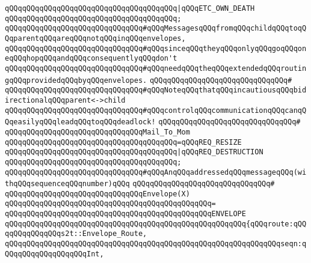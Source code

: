 \verb|qQQqqQQqqQQqqQQqqQQqqQQqqQQqqQQqqQQqqQQq|\verb#|qQQqETC_OWN_DEATH#\newline
\verb|qQQqqQQqqQQqqQQqqQQqqQQqqQQqqQQqqQQqqQQq;|\newline
\newline
\verb|qQQqqQQqqQQqqQQqqQQqqQQqqQQqqQQq#qQQqMessagesqQQqfromqQQqchildqQQqtoqQQqparentqQQqareqQQqnotqQQqinqQQqenvelopes,|\newline
\verb|qQQqqQQqqQQqqQQqqQQqqQQqqQQqqQQq#qQQqsinceqQQqtheyqQQqonlyqQQqgoqQQqoneqQQqhopqQQqandqQQqconsequentlyqQQqdon't|\newline
\verb|qQQqqQQqqQQqqQQqqQQqqQQqqQQqqQQq#qQQqneedqQQqtheqQQqextendedqQQqroutingqQQqprovidedqQQqbyqQQqenvelopes.|\newline
\verb|qQQqqQQqqQQqqQQqqQQqqQQqqQQqqQQq#|\newline
\verb|qQQqqQQqqQQqqQQqqQQqqQQqqQQqqQQq#qQQqNoteqQQqthatqQQqincautiousqQQqbidirectionalqQQqparent<->child|\newline
\verb|qQQqqQQqqQQqqQQqqQQqqQQqqQQqqQQq#qQQqcontrolqQQqcommunicationqQQqcanqQQqeasilyqQQqleadqQQqtoqQQqdeadlock!|\newline
\verb|qQQqqQQqqQQqqQQqqQQqqQQqqQQqqQQq#|\newline
\verb|qQQqqQQqqQQqqQQqqQQqqQQqqQQqqQQqMail_To_Mom|\newline
\verb|qQQqqQQqqQQqqQQqqQQqqQQqqQQqqQQqqQQqqQQq=qQQqREQ_RESIZE|\newline
\verb|qQQqqQQqqQQqqQQqqQQqqQQqqQQqqQQqqQQqqQQq|\verb#|qQQqREQ_DESTRUCTION#\newline
\verb|qQQqqQQqqQQqqQQqqQQqqQQqqQQqqQQqqQQqqQQq;|\newline
\newline
\verb|qQQqqQQqqQQqqQQqqQQqqQQqqQQqqQQq#qQQqAnqQQqaddressedqQQqmessageqQQq(withqQQqsequenceqQQqnumber)qQQq|\newline
\verb|qQQqqQQqqQQqqQQqqQQqqQQqqQQqqQQq#|\newline
\verb|qQQqqQQqqQQqqQQqqQQqqQQqqQQqqQQqEnvelope(X)|\newline
\verb|qQQqqQQqqQQqqQQqqQQqqQQqqQQqqQQqqQQqqQQqqQQqqQQq=|\newline
\verb|qQQqqQQqqQQqqQQqqQQqqQQqqQQqqQQqqQQqqQQqqQQqqQQqENVELOPE|\newline
\verb|qQQqqQQqqQQqqQQqqQQqqQQqqQQqqQQqqQQqqQQqqQQqqQQqqQQqqQQq{qQQqroute:qQQqqQQqqQQqqQQqs2t::Envelope_Route,|\newline
\verb|qQQqqQQqqQQqqQQqqQQqqQQqqQQqqQQqqQQqqQQqqQQqqQQqqQQqqQQqqQQqqQQqseqn:qQQqqQQqqQQqqQQqqQQqInt,|\newline

